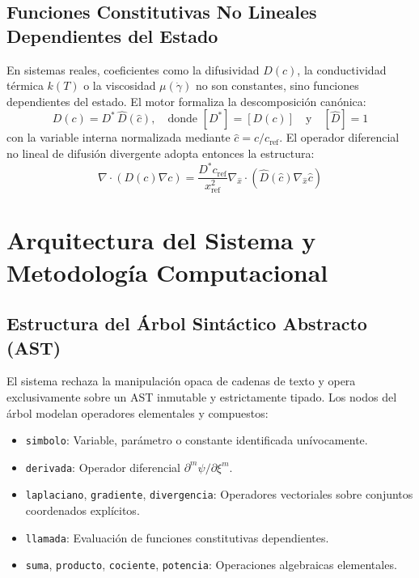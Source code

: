 \documentclass[11pt,a4paper]{article}
\theoremstyle{definition}
\theoremstyle{plain}
\theoremstyle{remark}
\newcommand{\refscale}[1]{#1_{\mathrm{ref}}}
\begin{document}
\subsection{Funciones Constitutivas No Lineales Dependientes del Estado}

En sistemas reales, coeficientes como la difusividad $D(c)$, la conductividad térmica $k(T)$ o la viscosidad $\mu(\dot{\gamma})$ no son constantes, sino funciones dependientes del estado. El motor formaliza la descomposición canónica:
\begin{equation}
    D(c) = D^* \, \hat{D}(\hat{c}), \quad \text{donde } [D^*] = [D(c)] \quad \text{y} \quad [\hat{D}] = 1
\end{equation}
con la variable interna normalizada mediante $\hat{c} = c / \refscale{c}$. El operador diferencial no lineal de difusión divergente adopta entonces la estructura:
\begin{equation}
    \nabla \cdot \left( D(c) \nabla c \right) = \frac{D^* \refscale{c}}{\refscale{x}^2} \nabla_{\hat{x}} \cdot \left( \hat{D}(\hat{c}) \nabla_{\hat{x}} \hat{c} \right)
\end{equation}

\section{Arquitectura del Sistema y Metodología Computacional}

\subsection{Estructura del Árbol Sintáctico Abstracto (AST)}

El sistema rechaza la manipulación opaca de cadenas de texto y opera exclusivamente sobre un AST inmutable y estrictamente tipado. Los nodos del árbol modelan operadores elementales y compuestos:
\begin{itemize}
    \item \texttt{simbolo}: Variable, parámetro o constante identificada unívocamente.
    \item \texttt{derivada}: Operador diferencial $\partial^m \psi / \partial \xi^m$.
    \item \texttt{laplaciano}, \texttt{gradiente}, \texttt{divergencia}: Operadores vectoriales sobre conjuntos coordenados explícitos.
    \item \texttt{llamada}: Evaluación de funciones constitutivas dependientes.
    \item \texttt{suma}, \texttt{producto}, \texttt{cociente}, \texttt{potencia}: Operaciones algebraicas elementales.
\end{itemize}
\end{document}
